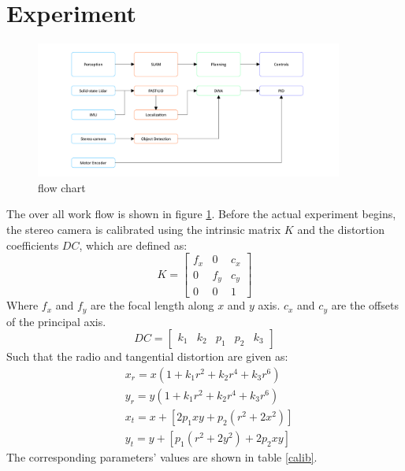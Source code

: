 \documentclass[balance,upint,subscriptcorrection,varvw,nofoot, mathalfa=cal=boondoxo,spanish,french,vietnamese,russian,greek,pdf-a,fontspec,colorlinks]{asmeconf}
\begin{document}
\section{Experiment}
\begin{figure}
	\center
	\includegraphics[width=0.9\textwidth]{flow_chart.png}
	\caption{flow chart}\label{flow}
	\end{figure}
The over all work flow is shown in figure \ref{flow}. Before the actual experiment begins, the stereo camera is calibrated using the intrinsic matrix $K$ and the distortion coefficients $DC$, which are defined as:
\begin{equation}
	K=\left[\begin{array}{ccc}f_{x} & 0 & c_{x} \\ 0 & f_{y} & c_{y} \\ 0 & 0 & 1\end{array}\right]
\end{equation}
Where $f_x$ and $f_y$ are the focal length along $x$ and $y$ axis. $c_x$ and $c_y$ are the offsets of the principal axis.
\begin{equation}
	DC =\left[\begin{array}{lllll}k_{1} & k_{2} & p_{1} & p_{2} & k_{3}\end{array}\right]
\end{equation}
Such that the radio and tangential distortion are given as:
\begin{equation}
	\begin{aligned}
		&x_r=x\left(1+k_{1} r^{2}+k_{2} r^{4}+k_{3} r^{6}\right) \\
		&y_r=y\left(1+k_{1} r^{2}+k_{2} r^{4}+k_{3} r^{6}\right) \\
		&x_t=x+\left[2 p_{1} x y+p_{2}\left(r^{2}+2 x^{2}\right)\right] \\
		&y_t=y+\left[p_{1}\left(r^{2}+2 y^{2}\right)+2 p_{2} x y\right]
		\end{aligned}
\end{equation}
The corresponding parameters' values are shown in table \ref{calib}.
\end{document}
